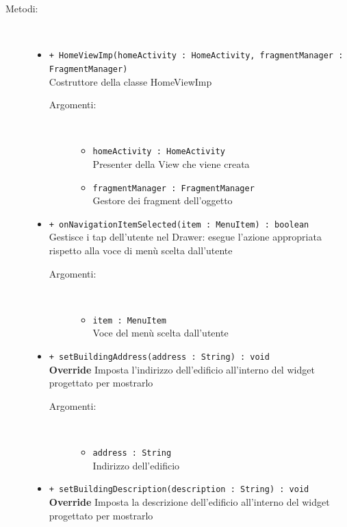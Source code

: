 \documentclass[../DefinizioneDiProdotto.tex]{subfiles}
\begin{document}
\begin{description}
\begin{itemize}
	\end{itemize}
	\item[Metodi:] \
	\begin{itemize}
		\item \texttt{+ HomeViewImp(homeActivity : HomeActivity, fragmentManager : FragmentManager)}\\
		Costruttore della classe HomeViewImp
		\begin{description}
			\item[Argomenti:] \
			\begin{itemize}
				\item \texttt{homeActivity : HomeActivity}\\
				Presenter della View che viene creata\item \texttt{fragmentManager : FragmentManager}\\
				Gestore dei fragment dell'oggetto\end{itemize}
		\end{description}
		\item \texttt{+ onNavigationItemSelected(item : MenuItem) : boolean}\\
		Gestisce i tap dell'utente nel Drawer: esegue l'azione appropriata rispetto alla voce di menù scelta dall'utente
		\begin{description}
			\item[Argomenti:] \
			\begin{itemize}
				\item \texttt{item : MenuItem}\\
				Voce del menù scelta dall'utente\end{itemize}
		\end{description}
		\item \texttt{+ setBuildingAddress(address : String) : void}\\
		\textbf{Override} Imposta l'indirizzo dell'edificio all'interno del widget progettato per mostrarlo
		\begin{description}
			\item[Argomenti:] \
			\begin{itemize}
				\item \texttt{address : String}\\
				Indirizzo dell'edificio\end{itemize}
		\end{description}
		\item \texttt{+ setBuildingDescription(description : String) : void}\\
		\textbf{Override} Imposta la descrizione dell'edificio all'interno del widget progettato per mostrarlo

\end{itemize}
\end{description}
\end{document}
